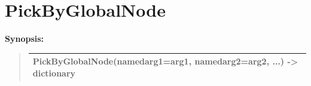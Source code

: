 \documentclass[letterpaper,10pt,english]{sphinxmanual}
\begin{document}
\section{PickByGlobalNode}
\label{functions:pickbyglobalnode}
\begin{DUlineblock}{0em}
\item[] \textbf{Synopsis:}
\end{DUlineblock}
\begin{quote}

\begin{tabulary}{\linewidth}{|L|}
\hline

PickByGlobalNode(namedarg1=arg1, namedarg2=arg2, ...) -\textgreater{} dictionary
\\
\hline\end{tabulary}

\end{quote}
\end{document}
